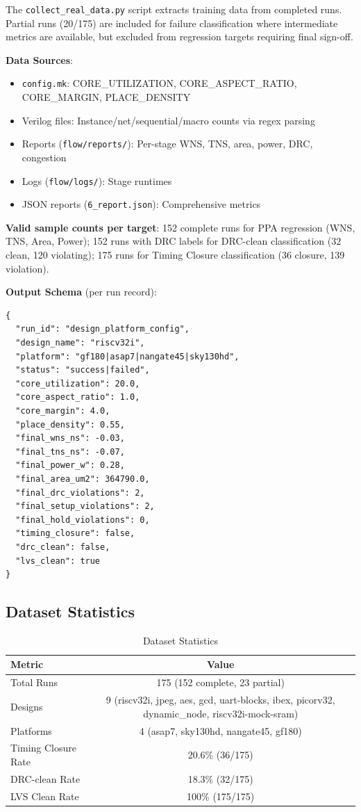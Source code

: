 \documentclass[10pt,conference]{IEEEtran}
\newcommand{\ORFS}{\text{ORFS}}
\begin{document}
The \texttt{collect\_real\_data.py} script extracts training data from completed \ORFS{} runs. Partial runs (20/175) are included for failure classification where intermediate metrics are available, but excluded from regression targets requiring final sign-off.

\textbf{Data Sources}:
\begin{itemize}
    \item \texttt{config.mk}: CORE\_UTILIZATION, CORE\_ASPECT\_RATIO, CORE\_MARGIN, PLACE\_DENSITY
    \item Verilog files: Instance/net/sequential/macro counts via regex parsing
    \item Reports (\texttt{flow/reports/}): Per-stage WNS, TNS, area, power, DRC, congestion
    \item Logs (\texttt{flow/logs/}): Stage runtimes
    \item JSON reports (\texttt{6\_report.json}): Comprehensive \ORFS{} metrics
\end{itemize}

\textbf{Valid sample counts per target}: 152 complete runs for PPA regression (WNS, TNS, Area, Power); 152 runs with DRC labels for DRC-clean classification (32 clean, 120 violating); 175 runs for Timing Closure classification (36 closure, 139 violation).

\textbf{Output Schema} (per run record):
\begin{Verbatim}[breaklines=true,breakanywhere=true]
{
  "run_id": "design_platform_config",
  "design_name": "riscv32i",
  "platform": "gf180|asap7|nangate45|sky130hd",
  "status": "success|failed",
  "core_utilization": 20.0,
  "core_aspect_ratio": 1.0,
  "core_margin": 4.0,
  "place_density": 0.55,
  "final_wns_ns": -0.03,
  "final_tns_ns": -0.07,
  "final_power_w": 0.28,
  "final_area_um2": 364790.0,
  "final_drc_violations": 2,
  "final_setup_violations": 2,
  "final_hold_violations": 0,
  "timing_closure": false,
  "drc_clean": false,
  "lvs_clean": true
}
\end{Verbatim}

\subsection{Dataset Statistics}
\label{sec:dataset_stats}

\begin{table}[t]
\centering
\caption{Dataset Statistics}
\label{tab:dataset_stats}
\begin{tabular}{@{}lc@{}}
\toprule
Metric & Value \\
\midrule
Total Runs & 175 (152 complete, 23 partial) \\
Designs & 9 (riscv32i, jpeg, aes, gcd, uart-blocks, ibex, picorv32, dynamic\_node, riscv32i-mock-sram) \\
Platforms & 4 (asap7, sky130hd, nangate45, gf180) \\
Timing Closure Rate & 20.6\% (36/175) \\
DRC-clean Rate & 18.3\% (32/175) \\
LVS Clean Rate & 100\% (175/175) \\
\bottomrule
\end{tabular}
\end{table}
\end{document}
